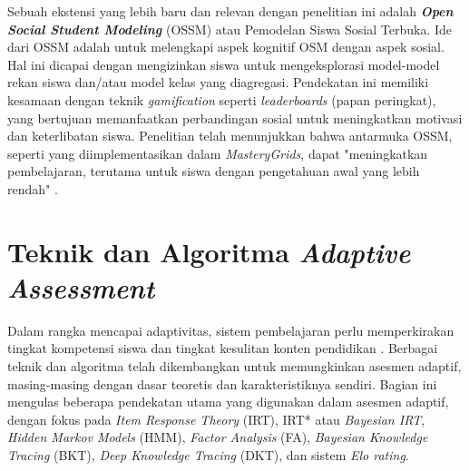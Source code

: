 Sebuah ekstensi yang lebih baru dan relevan dengan penelitian ini adalah
\textbf{\textit{Open Social Student Modeling}} (OSSM) atau
Pemodelan Siswa Sosial Terbuka. Ide dari OSSM adalah untuk
melengkapi aspek kognitif OSM dengan aspek sosial.
Hal ini dicapai dengan mengizinkan siswa untuk mengeksplorasi model-model
rekan siswa dan/atau model kelas yang diagregasi. Pendekatan ini memiliki
kesamaan dengan teknik \textit{gamification} seperti \textit{leaderboards}
(papan peringkat), yang bertujuan memanfaatkan perbandingan sosial untuk
meningkatkan motivasi dan keterlibatan siswa. Penelitian telah menunjukkan
bahwa antarmuka OSSM, seperti yang diimplementasikan dalam \textit{MasteryGrids},
dapat "meningkatkan pembelajaran, terutama untuk siswa dengan pengetahuan awal
yang lebih rendah" \autocite{Brusilovsky2016}.


\section{Teknik dan Algoritma \textit{Adaptive Assessment}}
\label{sec:teknik_algoritma_aa}
Dalam rangka mencapai adaptivitas, sistem pembelajaran perlu memperkirakan tingkat 
kompetensi siswa dan tingkat kesulitan konten pendidikan \autocite{Vesin2022}. 
Berbagai teknik dan algoritma telah dikembangkan untuk memungkinkan asesmen adaptif, 
masing-masing dengan dasar teoretis dan karakteristiknya sendiri. Bagian ini mengulas
beberapa pendekatan utama yang digunakan dalam asesmen adaptif, dengan fokus pada 
\textit{Item Response Theory} (IRT), IRT* atau \textit{Bayesian IRT}, \textit{Hidden Markov Models} (HMM),
\textit{Factor Analysis} (FA), \textit{Bayesian Knowledge Tracing} (BKT),
\textit{Deep Knowledge Tracing} (DKT), dan sistem \textit{Elo rating}.

